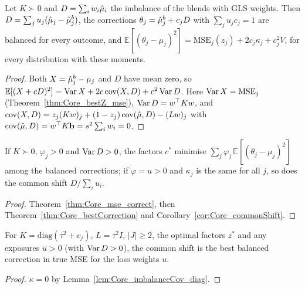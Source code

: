\begin{theorem}\label{thm:Core_mse_correct}
  \leanok
  Let $K \succ 0$ and $D = \sum_i w_i\hat\mu_i$ the imbalance of the blends with
  GLS weights. Then $D = \sum_j u_j(\hat\mu_j - \hat\mu_j^b)$, the corrections
  $\theta_j = \hat\mu_j^b + c_jD$ with $\sum_j u_jc_j = 1$ are balanced for every
  outcome, and $\mathbb E[(\theta_j - \mu_j)^2] = \mathrm{MSE}_j(z_j) + 2c_j\kappa_j + c_j^2V$,
  for every distribution with these moments.
\end{theorem}
\begin{proof}
  \leanok
  Both $X = \hat\mu_j^b - \mu_j$ and $D$ have mean zero, so
  $\mathbb E[(X + cD)^2] = \operatorname{Var} X + 2c\operatorname{cov}(X, D) + c^2\operatorname{Var} D$. Here
  $\operatorname{Var} X = \mathrm{MSE}_j$ (Theorem~\ref{thm:Core_bestZ_mse}),
  $\operatorname{Var} D = w^\top Kw$, and
  $\operatorname{cov}(X, D) = z_j(Kw)_j + (1 - z_j)\operatorname{cov}(\hat\mu, D) - (Lw)_j$ with
  $\operatorname{cov}(\hat\mu, D) = w^\top K\mathbf{b} = s^2\sum_iw_i = 0$.
\end{proof}

\begin{corollary}\label{cor:Core_bestCorrection_mse}
  \leanok
  If $K \succ 0$, $\varphi_j > 0$ and $\operatorname{Var} D > 0$, the factors $c^*$ minimise
  $\sum_j\varphi_j\,\mathbb E[(\theta_j - \mu_j)^2]$ among the balanced
  corrections; if $\varphi = u > 0$ and $\kappa_j$ is the same for all $j$, so
  does the common shift $D/\sum_iu_i$.
\end{corollary}
\begin{proof}
  \leanok
  Theorem~\ref{thm:Core_mse_correct}, then Theorem~\ref{thm:Core_bestCorrection}
  and Corollary~\ref{cor:Core_commonShift}.
\end{proof}

\begin{corollary}\label{cor:Core_commonShift_diag}
  \leanok
  For $K = \mathrm{diag}(\tau^2 + v_j)$, $L = \tau^2I$, $|J| \ge 2$, the optimal
  factors $z^*$ and any exposures $u > 0$ (with $\operatorname{Var} D > 0$), the common shift
  is the best balanced correction in true MSE for the loss weights $u$.
\end{corollary}
\begin{proof}
  \leanok
  $\kappa = 0$ by Lemma~\ref{lem:Core_imbalanceCov_diag}.
\end{proof}

